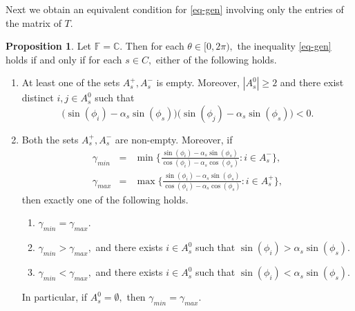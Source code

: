 \documentclass{amsart}
\theoremstyle{definition}
\newtheorem{prop}[theorem]{Proposition}
\theoremstyle{remark}
\numberwithin{equation}{section}
\begin{document}
Next we obtain an equivalent condition for \eqref{eq-gen} involving only the entries of the matrix of $T$.
\begin{prop}\label{prop-gen}
Let $\mathbb{F}=\mathbb{C}.$	Then for each $\theta \in [0,2\pi),$ the inequality \eqref{eq-gen}
		holds if and only if for each $s\in C,$ either of the following holds.
		\begin{enumerate}
			\item At least one of the sets $A_s^+,A_s^-$ is empty. Moreover, $|A_s^0|\geq 2$ and there exist distinct $i,j\in  A_s^0$ such that  $$\Big(\sin(\phi_i)-\alpha_s\sin(\phi_s)\Big)\Big(\sin(\phi_j)-\alpha_s\sin(\phi_s)\Big)<0.$$
			\item Both the sets $A_s^+,A_s^-$ are non-empty. Moreover, if %
			\begin{eqnarray*}
				\gamma_{min}&=&\min\Big\{\frac{\sin(\phi_i)-\alpha_s \sin(\phi_s)}{\cos(\phi_i)-\alpha_s \cos(\phi_s)}:i\in A_s^-\Big\},	\\
				\gamma_{max}&=&\max\Big\{\frac{\sin(\phi_i)-\alpha_s \sin(\phi_s)}{\cos(\phi_i)-\alpha_s \cos(\phi_s)}:i\in A_s^+\Big\},
			\end{eqnarray*}	
			then exactly one of the following holds.
			\begin{enumerate}
				\item $\gamma_{min}=\gamma_{max}.$
				\item $\gamma_{min}>\gamma_{max},$ and there exists $i\in A_s^0$ such that $\sin(\phi_i)>\alpha_s\sin(\phi_s).$
				\item $\gamma_{min}<\gamma_{max},$ and there exists $i\in A_s^0$ such that $\sin(\phi_i)<\alpha_s\sin(\phi_s).$
			\end{enumerate}
			In particular, if $A_s^0=\emptyset,$ then $\gamma_{min}=\gamma_{max}.$
		\end{enumerate}
	\end{prop}
\end{document}
